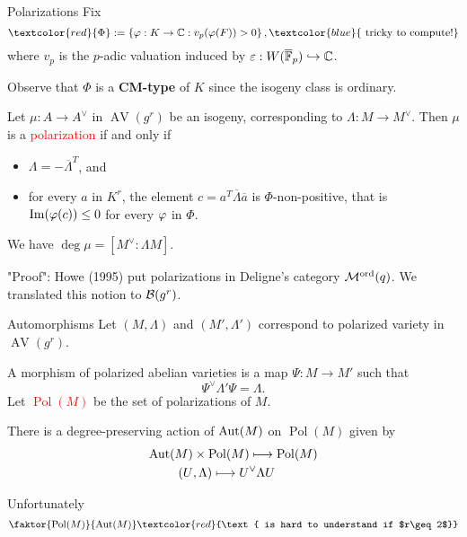 \documentclass[usenames,dvipsnames]{beamer}
\DeclareMathOperator{\AV}{AV}
\DeclareMathOperator{\Pol}{Pol}
\newcommand{\Modord}[1]{\cM^{\text{ord}}({#1})}
\newcommand{\red}[1]{\textcolor{red}{#1}}
\newcommand{\blue}[1]{\textcolor{blue}{#1}}
\begin{document}
\begin{frame}{ Polarizations }
Fix
\[ \red{ \Phi }:=\set{ \vphi:K \to \C : v_p(\vphi(F))>0 }, \blue{\text{ tricky to compute!}} \]
where $v_p$ is the $p$-adic valuation induced by $\varepsilon: W(\overline{\mathbb{F}}_p)\hookrightarrow \mathbb{C}$.

\pause Observe that $\Phi$ is a \textbf{CM-type} of $K$ since the isogeny class is ordinary.

\pause
\begin{thm}
 Let $\mu:A\to A^\vee$ in $\AV(g^r)$ be an isogeny, corresponding to $\Lambda:M\to M^\vee$.
 \pause Then $\mu$ is a \red{polarization} if and only if
 \begin{itemize}
  \item $\Lambda = -\overline\Lambda^T$, and
  \item for every $a$ in $K^r$, the element
    $c=a^T\overline\Lambda \overline a $
    is $\Phi$-non-positive, that is $\operatorname{Im}({\varphi}(c)) \leq 0$ for every ${\varphi}$ in $\Phi$.
 \end{itemize}
 \pause We have $\deg \mu = [M^\vee : \Lambda M]$.
\end{thm}

\pause "Proof": Howe (1995) put polarizations in Deligne's category $\Modord{q}$. We translated this notion to ${\mathcal B}(g^r)$. 

\end{frame}

\begin{frame}{ Automorphisms }
Let $(M,\Lambda)$ and $(M',\Lambda')$ correspond to polarized variety in $\AV(g^r)$.

\pause A morphism of polarized abelian varieties is a map $\Psi:M \to M'$ such that
\[ \Psi^\vee\Lambda'\Psi = \Lambda. \]
\pause Let \red{$\Pol(M)$} be the set of polarizations of $M$.
\pause
\begin{thm}
There is a degree-preserving action of $\operatorname{Aut}(M)$ on $\Pol(M)$ given by
\begin{align*}
\Aut(M) & \times \Pol(M) \longmapsto \Pol(M)\\
(U &, \Lambda) \longmapsto U^\vee \Lambda U
\end{align*}
\end{thm}
\pause Unfortunately
\[ \faktor{\Pol(M)}{\Aut(M)} \red{\text{ is hard to understand if $r\geq 2$}} \]
\end{frame}
\end{document}
